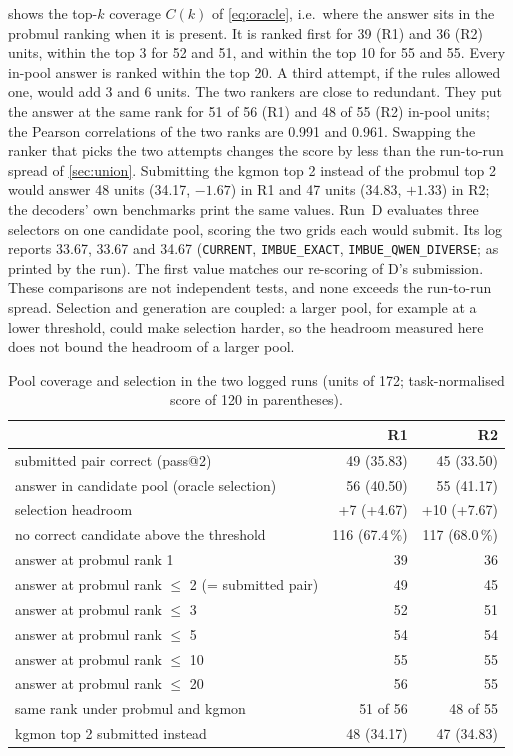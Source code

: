 \documentclass[11pt]{article}
\newcommand{\code}[1]{\texttt{#1}}
\newcommand{\R}[1]{R#1}
\begin{document}
 shows the top-$k$ coverage $C(k)$ of \cref{eq:oracle}, i.e.\ where the answer sits in the probmul ranking when it is present.
It is ranked first for 39 (\R{1}) and 36 (\R{2}) units, within the top 3 for 52 and 51, and within the top 10 for 55 and 55. Every in-pool answer is ranked within the top 20.
A third attempt, if the rules allowed one, would add 3 and 6 units.
The two rankers are close to redundant. They put the answer at the same rank for 51 of 56 (\R{1}) and 48 of 55 (\R{2}) in-pool units; the Pearson correlations of the two ranks are 0.991 and 0.961.
Swapping the ranker that picks the two attempts changes the score by less than the run-to-run spread of \cref{sec:union}. Submitting the kgmon top 2 instead of the probmul top 2 would answer 48 units (34.17, $-1.67$) in \R{1} and 47 units (34.83, $+1.33$) in \R{2}; the decoders' own benchmarks print the same values.
Run~D evaluates three selectors on one candidate pool, scoring the two grids each would submit. Its log reports 33.67, 33.67 and 34.67 (\code{CURRENT}, \code{IMBUE\_EXACT}, \code{IMBUE\_QWEN\_DIVERSE}; as printed by the run). The first value matches our re-scoring of D's submission. These comparisons are not independent tests, and none exceeds the run-to-run spread.
Selection and generation are coupled: a larger pool, for example at a lower threshold, could make selection harder, so the headroom measured here does not bound the headroom of a larger pool.

\begin{table}[t]
\centering
\caption{Pool coverage and selection in the two logged runs (units of 172; task-normalised score of 120 in parentheses).}
\label{tab:pool}
\begin{tabular}{lrr}
\toprule
 & \R{1} & \R{2} \\
\midrule
submitted pair correct (pass@2) & 49 (35.83) & 45 (33.50) \\
answer in candidate pool (oracle selection) & 56 (40.50) & 55 (41.17) \\
selection headroom & +7 (+4.67) & +10 (+7.67) \\
no correct candidate above the threshold & 116 (67.4\,\%) & 117 (68.0\,\%) \\
\midrule
answer at probmul rank 1 & 39 & 36 \\
answer at probmul rank $\le$ 2 (= submitted pair) & 49 & 45 \\
answer at probmul rank $\le$ 3 & 52 & 51 \\
answer at probmul rank $\le$ 5 & 54 & 54 \\
answer at probmul rank $\le$ 10 & 55 & 55 \\
answer at probmul rank $\le$ 20 & 56 & 55 \\
same rank under probmul and kgmon & 51 of 56 & 48 of 55 \\
kgmon top 2 submitted instead & 48 (34.17) & 47 (34.83) \\
\bottomrule
\end{tabular}
\end{table}
\end{document}
